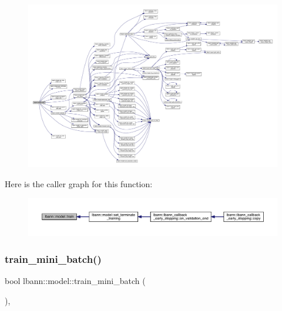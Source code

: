 \begin{figure}[H]
\begin{center}
\leavevmode
\includegraphics[width=350pt]{classlbann_1_1model_a11c79dc3783d11b799bdc40ff9c92ddc_cgraph}
\end{center}
\end{figure}
Here is the caller graph for this function\+:\nopagebreak
\begin{figure}[H]
\begin{center}
\leavevmode
\includegraphics[width=350pt]{classlbann_1_1model_a11c79dc3783d11b799bdc40ff9c92ddc_icgraph}
\end{center}
\end{figure}
\mbox{\label{classlbann_1_1model_a462105993a63277a1ead39c30ebae1bb}} 
\subsubsection{\texorpdfstring{train\+\_\+mini\+\_\+batch()}{train\_mini\_batch()}}
{\footnotesize\ttfamily bool lbann\+::model\+::train\+\_\+mini\+\_\+batch (\begin{DoxyParamCaption}{ }\end{DoxyParamCaption})\hspace{0.3cm}{\ttfamily [protected]}, {\ttfamily [virtual]}}

